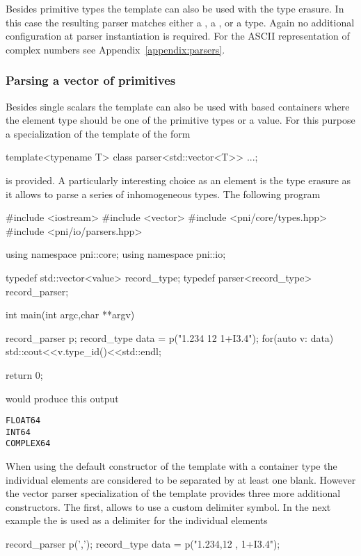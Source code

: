 Besides primitive types the  template can also be used with 
the  type erasure. In this case the resulting parser matches 
either a , a , or a  type. Again 
no additional configuration at parser instantiation is required. 
For the ASCII representation of complex numbers see
Appendix~\ref{appendix:parsers}.

\subsubsection{Parsing a vector of primitives}

Besides single scalars the  template can also be used with 
 based containers where the element type should be one 
of the primitive types or a value. 
For this purpose a specialization of the  template of the 
form
\begin{cppcode}
template<typename T> class parser<std::vector<T>> {...};
\end{cppcode}
is provided.
A particularly interesting choice as an element is the  type
erasure as it allows to parse a series of inhomogeneous types.
The following program
\begin{cppcode}
#include <iostream>
#include <vector>
#include <pni/core/types.hpp>
#include <pni/io/parsers.hpp>

using namespace pni::core;
using namespace pni::io;

typedef std::vector<value> record_type;
typedef parser<record_type> record_parser;

int main(int argc,char **argv)
{
    record_parser p;
    record_type data = p("1.234  12 1+I3.4");
    for(auto v: data)
        std::cout<<v.type_id()<<std::endl;

    return 0;
}
\end{cppcode}
would produce this output
\begin{verbatim}
FLOAT64
INT64
COMPLEX64
\end{verbatim}
When using the default constructor of the  template with a 
container type the individual elements are considered to be separated by 
at least one blank. 
However the vector parser specialization
of the  template provides three more additional constructors. 
The first,  allows to use a custom delimiter symbol.
In the next example the  is used as a delimiter for the individual 
elements
\begin{cppcode}
record_parser p(',');
record_type data = p("1.234,12 , 1+I3.4");
\end{cppcode}
